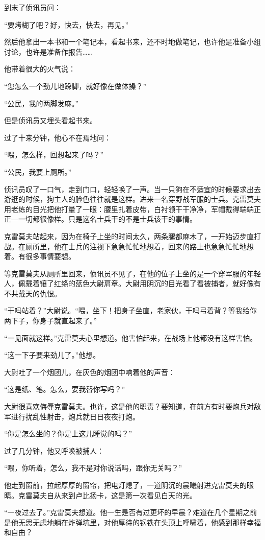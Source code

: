 到末了侦讯员问：

“要烤糊了吧？好，快去，快去，再见。”

然后他拿出一本书和一个笔记本，看起书来，还不时地做笔记，也许他是准备小组讨论，也许是准备作报告……

他带着很大的火气说：

“您怎么一个劲儿地跺脚，就好像在做体操？”

“公民，我的两脚发麻。”

但是侦讯员又埋头看起书来。

过了十来分钟，他心不在焉地问：

“喂，怎么样，回想起来了吗？”

“公民，我要上厕所。”

侦讯员叹了一口气，走到门口，轻轻唤了一声。当一只狗在不适宜的时候要求出去游逛的时候，狗主人的脸色往往就是这样。进来一名穿野战军服的士兵。克雷莫夫用老练的目光把他打量了一眼：腰里扎着皮带，白衬领干干净净，军帽戴得端端正正—一切都很像样。只是这名士兵干的不是士兵该干的事情。

克雷莫夫站起来，因为在椅子上坐的时间太久，两条腿都麻木了，一开始迈步直打战。在厕所里，他在士兵的注视下急急忙忙地想着，回来的路上也急急忙忙地想着。有很多事情要想。

等克雷莫夫从厕所里回来，侦讯员不见了，在他的位子上坐的是一个穿军服的年轻人，佩戴着镶了红绦的蓝色大尉肩章。大尉用阴沉的目光看了看被捕者，就好像有不共戴天的仇恨。

“干吗站着？”大尉说。“喂，坐下！把身子坐直，老家伙，干吗弓着背？等我给你两下子，你身子就直起来了。”

“一见面就这样。”克雷莫夫心里想道。他害怕起来，在战场上他都没有这样害怕。

“这一下子要来劲儿了。”他想。

大尉吐了一个烟团儿，在灰色的烟团中响着他的声音：

“这是纸、笔。怎么，要我替你写吗？”

大尉很喜欢侮辱克雷莫夫。也许，这是他的职责？要知道，在前方有时要炮兵对敌军进行扰乱性射击，炮兵就日日夜夜打炮。

“你是怎么坐的？你是上这儿睡觉的吗？”

过了几分钟，他又呼唤被捕人：

“喂，你听着，怎么，我不是对你说话吗，跟你无关吗？”

他走到窗前，拉起厚厚的窗帘，把电灯熄了，一道阴沉的晨曦射进克雷莫夫的眼睛。克雷莫夫自从来到卢比扬卡，这是第一次看见白天的光。

“一夜过去了。”克雷莫夫想道。他一生是否有过更坏的早晨？难道在几个星期之前是他无思无虑地躺在炸弹坑里，对他厚待的钢铁在头顶上呼啸着，他感到那样幸福和自由？

